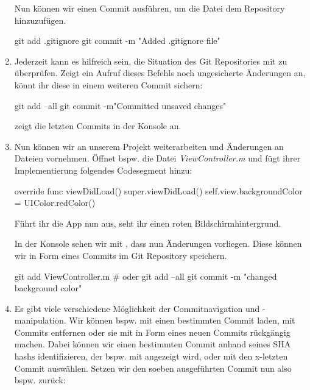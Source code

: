 \documentclass[parskip=half, final]{scrreprt}
\begin{document}
\begin{lecture}
\begin{enumerate}
Nun können wir einen Commit ausführen, um die Datei dem Repository hinzuzufügen.

\begin{shcode}
git add .gitignore
git commit -m "Added .gitignore file"
\end{shcode}

\item Jederzeit kann es hilfreich sein, die Situation des Git Repositories mit  zu überprüfen. Zeigt ein Aufruf dieses Befehls noch ungesicherte Änderungen an, könnt ihr diese in einem weiteren Commit sichern:

\begin{shcode}
git add --all
git commit -m"Committed unsaved changes"
\end{shcode}

 zeigt die letzten Commits in der Konsole an.

\item Nun können wir an unserem Projekt weiterarbeiten und Änderungen an Dateien vornehmen. Öffnet bspw. die Datei \emph{ViewController.m} und fügt ihrer Implementierung folgendes Codesegment hinzu:

\begin{swiftcode}
override func viewDidLoad() {
    super.viewDidLoad()
    self.view.backgroundColor = UIColor.redColor()
}
\end{swiftcode}

Führt ihr die App nun aus, seht ihr einen roten Bildschirmhintergrund.

In der Konsole sehen wir mit , dass nun Änderungen vorliegen. Diese können wir in Form eines Commits im Git Repository speichern.

\begin{shcode}
git add ViewController.m # oder git add --all
git commit -m "changed background color"
\end{shcode}

\item Es gibt viele verschiedene Möglichkeit der Commitnavigation und -manipulation. Wir können bspw. mit  einen bestimmten Commit laden, mit  Commits entfernen oder sie mit  in Form eines neuen Commits rückgängig machen. Dabei können wir einen bestimmten Commit anhand seines SHA hashs identifizieren, der bspw. mit  angezeigt wird, oder mit  den x-letzten Commit auswählen. Setzen wir den soeben ausgeführten Commit nun also bspw. zurück:


\end{enumerate}
\end{lecture}
\end{document}
